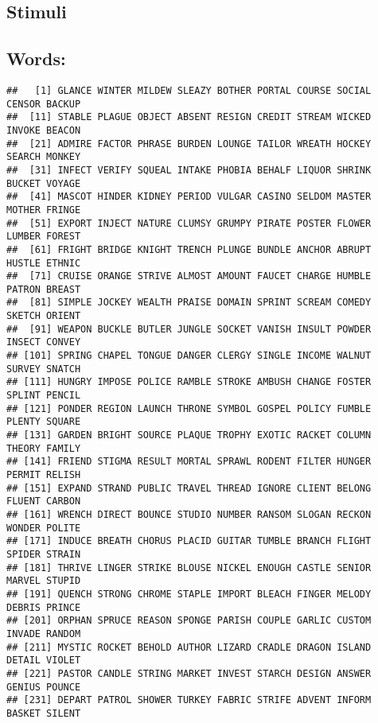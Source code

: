 \documentclass[
  english,
  man,floatsintext]{apa6}
\begin{document}
\begin{appendix}
\hypertarget{stimuli}{%
\section{Stimuli}\label{stimuli}}

\hypertarget{words}{%
\subsection{Words:}\label{words}}

\begin{verbatim}
##   [1] GLANCE WINTER MILDEW SLEAZY BOTHER PORTAL COURSE SOCIAL CENSOR BACKUP
##  [11] STABLE PLAGUE OBJECT ABSENT RESIGN CREDIT STREAM WICKED INVOKE BEACON
##  [21] ADMIRE FACTOR PHRASE BURDEN LOUNGE TAILOR WREATH HOCKEY SEARCH MONKEY
##  [31] INFECT VERIFY SQUEAL INTAKE PHOBIA BEHALF LIQUOR SHRINK BUCKET VOYAGE
##  [41] MASCOT HINDER KIDNEY PERIOD VULGAR CASINO SELDOM MASTER MOTHER FRINGE
##  [51] EXPORT INJECT NATURE CLUMSY GRUMPY PIRATE POSTER FLOWER LUMBER FOREST
##  [61] FRIGHT BRIDGE KNIGHT TRENCH PLUNGE BUNDLE ANCHOR ABRUPT HUSTLE ETHNIC
##  [71] CRUISE ORANGE STRIVE ALMOST AMOUNT FAUCET CHARGE HUMBLE PATRON BREAST
##  [81] SIMPLE JOCKEY WEALTH PRAISE DOMAIN SPRINT SCREAM COMEDY SKETCH ORIENT
##  [91] WEAPON BUCKLE BUTLER JUNGLE SOCKET VANISH INSULT POWDER INSECT CONVEY
## [101] SPRING CHAPEL TONGUE DANGER CLERGY SINGLE INCOME WALNUT SURVEY SNATCH
## [111] HUNGRY IMPOSE POLICE RAMBLE STROKE AMBUSH CHANGE FOSTER SPLINT PENCIL
## [121] PONDER REGION LAUNCH THRONE SYMBOL GOSPEL POLICY FUMBLE PLENTY SQUARE
## [131] GARDEN BRIGHT SOURCE PLAQUE TROPHY EXOTIC RACKET COLUMN THEORY FAMILY
## [141] FRIEND STIGMA RESULT MORTAL SPRAWL RODENT FILTER HUNGER PERMIT RELISH
## [151] EXPAND STRAND PUBLIC TRAVEL THREAD IGNORE CLIENT BELONG FLUENT CARBON
## [161] WRENCH DIRECT BOUNCE STUDIO NUMBER RANSOM SLOGAN RECKON WONDER POLITE
## [171] INDUCE BREATH CHORUS PLACID GUITAR TUMBLE BRANCH FLIGHT SPIDER STRAIN
## [181] THRIVE LINGER STRIKE BLOUSE NICKEL ENOUGH CASTLE SENIOR MARVEL STUPID
## [191] QUENCH STRONG CHROME STAPLE IMPORT BLEACH FINGER MELODY DEBRIS PRINCE
## [201] ORPHAN SPRUCE REASON SPONGE PARISH COUPLE GARLIC CUSTOM INVADE RANDOM
## [211] MYSTIC ROCKET BEHOLD AUTHOR LIZARD CRADLE DRAGON ISLAND DETAIL VIOLET
## [221] PASTOR CANDLE STRING MARKET INVEST STARCH DESIGN ANSWER GENIUS POUNCE
## [231] DEPART PATROL SHOWER TURKEY FABRIC STRIFE ADVENT INFORM BASKET SILENT
\end{verbatim}


\end{appendix}
\end{document}
